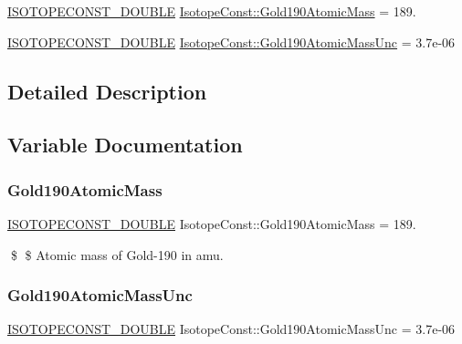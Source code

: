 \begin{DoxyCompactItemize}
\item 
\mbox{\hyperlink{group___isotope_const-_macros_ga8f45a7272ce02c0b4c65c44636ed719a}{I\+S\+O\+T\+O\+P\+E\+C\+O\+N\+S\+T\+\_\+\+D\+O\+U\+B\+LE}} \mbox{\hyperlink{group___isotope_const-_gold-_au190_ga62ab4f263cb22df59f2bae65f4bf5801}{Isotope\+Const\+::\+Gold190\+Atomic\+Mass}} = 189.
\item 
\mbox{\hyperlink{group___isotope_const-_macros_ga8f45a7272ce02c0b4c65c44636ed719a}{I\+S\+O\+T\+O\+P\+E\+C\+O\+N\+S\+T\+\_\+\+D\+O\+U\+B\+LE}} \mbox{\hyperlink{group___isotope_const-_gold-_au190_gaf207d821f3f32f0386c412086348d010}{Isotope\+Const\+::\+Gold190\+Atomic\+Mass\+Unc}} = 3.\+7e-\/06
\end{DoxyCompactItemize}


\subsection{Detailed Description}


\subsection{Variable Documentation}
\mbox{\label{group___isotope_const-_gold-_au190_ga62ab4f263cb22df59f2bae65f4bf5801}} 
\subsubsection{\texorpdfstring{Gold190\+Atomic\+Mass}{Gold190AtomicMass}}
{\footnotesize\ttfamily \mbox{\hyperlink{group___isotope_const-_macros_ga8f45a7272ce02c0b4c65c44636ed719a}{I\+S\+O\+T\+O\+P\+E\+C\+O\+N\+S\+T\+\_\+\+D\+O\+U\+B\+LE}} Isotope\+Const\+::\+Gold190\+Atomic\+Mass = 189.}

\$ \$ Atomic mass of Gold-\/190 in amu. \mbox{\label{group___isotope_const-_gold-_au190_gaf207d821f3f32f0386c412086348d010}} 
\subsubsection{\texorpdfstring{Gold190\+Atomic\+Mass\+Unc}{Gold190AtomicMassUnc}}
{\footnotesize\ttfamily \mbox{\hyperlink{group___isotope_const-_macros_ga8f45a7272ce02c0b4c65c44636ed719a}{I\+S\+O\+T\+O\+P\+E\+C\+O\+N\+S\+T\+\_\+\+D\+O\+U\+B\+LE}} Isotope\+Const\+::\+Gold190\+Atomic\+Mass\+Unc = 3.\+7e-\/06}

